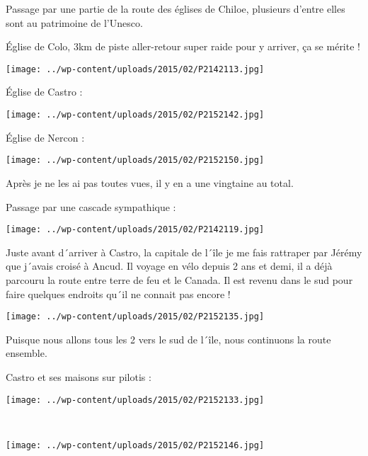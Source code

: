 \pagebreak
 Passage par une partie de la route des églises de Chiloe, plusieurs d'entre elles sont au patrimoine de l'Unesco.

 \'Eglise de Colo, 3km de piste aller-retour super raide pour y arriver, ça se mérite !

\begin{center} \texttt{[image: ../wp-content/uploads/2015/02/P2142113.jpg]} \end{center}

 \'Eglise de Castro :
\begin{center} \texttt{[image: ../wp-content/uploads/2015/02/P2152142.jpg]} \end{center}

 \'Eglise de Nercon :
\begin{center} \texttt{[image: ../wp-content/uploads/2015/02/P2152150.jpg]} \end{center}

 Après je ne les ai pas toutes vues, il y en a une vingtaine au total.

 Passage par une cascade sympathique :
\begin{center} \texttt{[image: ../wp-content/uploads/2015/02/P2142119.jpg]} \end{center}

 Juste avant d´arriver à Castro, la capitale de l´île je me fais rattraper par Jérémy que j´avais croisé à Ancud. Il voyage en vélo depuis 2 ans et demi, il a déjà parcouru la route entre terre de feu et le Canada. Il est revenu dans le sud pour faire quelques endroits qu´il ne connait pas encore !
\begin{center} \texttt{[image: ../wp-content/uploads/2015/02/P2152135.jpg]} \end{center}

 Puisque nous allons tous les 2 vers le sud de l´île, nous continuons la route ensemble.

 Castro et ses maisons sur pilotis :
\begin{center} \texttt{[image: ../wp-content/uploads/2015/02/P2152133.jpg]} \end{center}
\vspace{-\topsep}

\pagebreak
~\\
\begin{center} \texttt{[image: ../wp-content/uploads/2015/02/P2152146.jpg]} \end{center}

